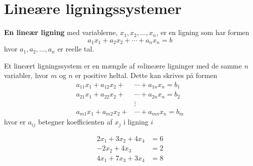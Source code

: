 \section{Lineære ligningssystemer }
%

\textbf{En lineær ligning} med variablerne, $x_1,x_2,\ldots ,x_n$, er en ligning som har formen
$$ a_1x_1+a_2x_2+\cdots+a_nx_n=b$$ 
hvor $a_1,a_2,\ldots,a_n$ er reelle tal. 

\begin{defn}{}{}
Et lineært ligningssystem er en mængde af $m $lineære ligninger  med de samme $n$ variabler, hvor $m$ og $n$ er positive heltal. Dette kan skrives på formen
\begin{align*}
a_{11}x_1+a_{12}x_2+&\cdots+a_{1n}x_n=b_1\\
a_{21}x_1+a_{22}x_2+&\cdots+a_{2n}x_n=b_2\\
&\vdots\\
a_{m1}x_1+a_{m2}x_2+&\cdots +a_{mn}x_n=b_m
\end{align*}
hvor er $a_{ij}$ betegner koefficienten af $x_j$ i ligning $i$
\end{defn}

\begin{eks}
\begin{align*}
2x_1+3x_2+4x_4&=6\\
-2x_2+4x_3&=2\\
4x_1+7x_3+3x_4&=8\\
\end{align*}

\end{eks}

